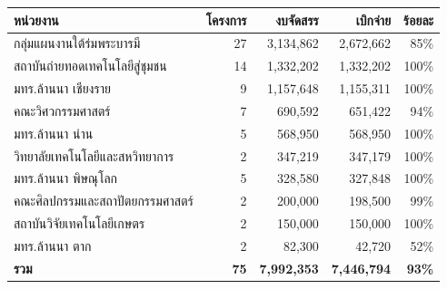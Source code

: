 \begin{center}\small
\setlength{\tabcolsep}{6pt}\renewcommand{\arraystretch}{1.3}
\begin{tabular}{p{6.6cm}rrrr}
\toprule
\rowcolor{rpfnavy!12}
\textbf{หน่วยงาน} & \textbf{โครงการ} & \textbf{งบจัดสรร} & \textbf{เบิกจ่าย} & \textbf{ร้อยละ}\\
\midrule
กลุ่มแผนงานใต้ร่มพระบารมี & 27 & 3,134,862 & 2,672,662 & 85\%\\
สถาบันถ่ายทอดเทคโนโลยีสู่ชุมชน & 14 & 1,332,202 & 1,332,202 & 100\%\\
มทร.ล้านนา เชียงราย & 9 & 1,157,648 & 1,155,311 & 100\%\\
คณะวิศวกรรมศาสตร์ & 7 & 690,592 & 651,422 & 94\%\\
มทร.ล้านนา น่าน & 5 & 568,950 & 568,950 & 100\%\\
วิทยาลัยเทคโนโลยีและสหวิทยาการ & 2 & 347,219 & 347,179 & 100\%\\
มทร.ล้านนา พิษณุโลก & 5 & 328,580 & 327,848 & 100\%\\
คณะศิลปกรรมและสถาปัตยกรรมศาสตร์ & 2 & 200,000 & 198,500 & 99\%\\
สถาบันวิจัยเทคโนโลยีเกษตร & 2 & 150,000 & 150,000 & 100\%\\
มทร.ล้านนา ตาก & 2 & 82,300 & 42,720 & 52\%\\
\midrule
\rowcolor{rpfgold!15}
\textbf{รวม} & \textbf{75} & \textbf{7,992,353} & \textbf{7,446,794} & \textbf{93\%}\\
\bottomrule
\end{tabular}
\end{center}
